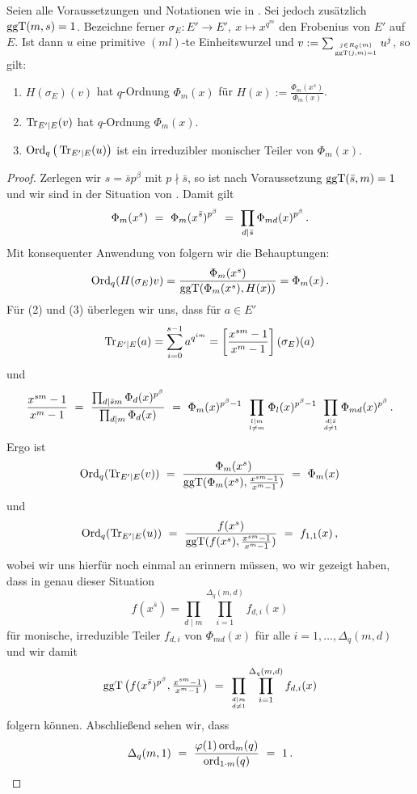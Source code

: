 \begin{satz}
  \label{satz:q_ordnung_von_trace}
  Seien alle Voraussetzungen und Notationen wie in 
  .
  Sei jedoch zusätzlich $\operatorname{ggT}(m,s) = 1$.
  Bezeichne ferner 
  $\sigma_E: E'\to E',\ x \mapsto x^{q^m}$ den Frobenius von $E'$ auf $E$.
  Ist dann $u$ eine primitive $(ml)$-te Einheitswurzel
  und $v := \sum_{j\in R_q(m)\atop \operatorname{ggT}(j,m)=1} u^j$, so gilt:
  \begin{enumerate}
    \item $H(\sigma_E)(v)$ hat $q$-Ordnung $\Phi_m(x)$ für 
      $H(x) := \frac{\Phi_m(x^s)}{\Phi_m(x)}$.
    \item $\operatorname{Tr}_{E'\mid E}(v)$ hat $q$-Ordnung $\Phi_m(x)$.
    \item $\operatorname{Ord}_q\big(\operatorname{Tr}_{E'\mid E}(u)\big)$ ist ein irreduzibler 
      monischer Teiler von $\Phi_m(x)$.
  \end{enumerate}
\end{satz}
\begin{proof}
  Zerlegen wir $s = \bar s p^\beta$ mit $p\nmid \bar s$, so ist 
  nach Voraussetzung $\operatorname{ggT}(\bar s, m) = 1$ und wir sind in der Situation von
  . Damit gilt
  \[ \Phi_m(x^s) \ =\  \Phi_m(x^{\bar s})^{p^\beta}
    \ =\  \prod_{d \mid \bar s} \Phi_{md}(x)^{p^\beta}\,.\]
  Mit konsequenter Anwendung von 
  folgern wir die Behauptungen:
  \[ \operatorname{Ord}_q(H(\sigma_E)v) = \frac{\Phi_m(x^s)}{\operatorname{ggT}(\Phi_m(x^s), H(x))}
    = \Phi_m(x)\,.\]
  Für (2) und (3) überlegen wir uns, dass für $a \in E'$
  \[ \operatorname{Tr}_{E'\mid E}(a) = \sum_{i=0}^{s-1} a^{q^{im}} = 
    \left[\frac{x^{sm}-1}{x^m-1}\right](\sigma_E)(a)\]
  und 
  \[ \frac{x^{sm} -1}{x^m-1} \speq= 
    \frac{ \prod_{d\mid \bar sm} \Phi_d(x)^{p^\beta}}{
      \prod_{d\mid m} \Phi_d(x)} \speq=
    \Phi_m(x)^{p^\beta-1}\ 
    \prod_{l\mid m\atop l\neq m} \Phi_l(x)^{p^\beta-1}\ 
    \prod_{d\mid \bar s\atop d\neq 1} \Phi_{md}(x)^{p^\beta} \,.\]
  Ergo ist
  \[ \operatorname{Ord}_q(\operatorname{Tr}_{E'\mid E}(v)) \ =\  
    \frac{\Phi_m(x^s)}{\operatorname{ggT}(\Phi_m(x^s), \frac{x^{sm}-1}{x^m-1})}
    \ =\  \Phi_m(x)\]
  und
  \[ \operatorname{Ord}_q(\operatorname{Tr}_{E'\mid E}(u)) \ =\  
    \frac{f(x^s)}{\operatorname{ggT}(f(x^s), \frac{x^{sm}-1}{x^m-1})} \ =\  f_{1,1}(x) \,,\]
  wobei wir uns hierfür noch einmal an 
  erinnern müssen, wo wir gezeigt haben, dass in genau dieser Situation 
  \[ f(x^{\bar s}) = \prod_{d\mid m} \prod_{i=1}^{\Delta_q(m,d)} f_{d,i}(x) \]
  für monische, irreduzible Teiler $f_{d,i}$ von $\Phi_{md}(x)$ für alle 
  $i=1,\ldots,\Delta_q(m,d)$ und wir damit 
  \[ \operatorname{ggT}\big(f(x^{\bar s})^{p^\beta}, \tfrac{x^{sm}-1}{x^m-1}\big) \ =\ 
    \prod_{d\mid m\atop d \neq 1} \prod_{i=1}^{\Delta_q(m,d)} f_{d,i}(x) \]
  folgern können. Abschließend sehen wir, dass
  \[ \Delta_q(m,1) \ =\  \frac{\varphi(1) \operatorname{ord}_m(q)}{\operatorname{ord}_{1\cdot m}(q)}
    \ =\  1\,.\]
\end{proof}



